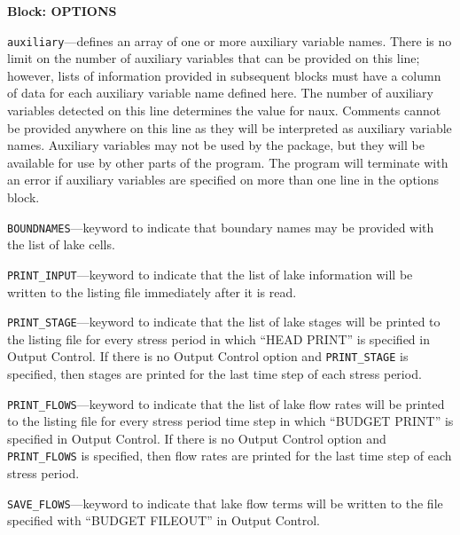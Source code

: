 
\item \textbf{Block: OPTIONS}

\begin{description}
\item \texttt{auxiliary}---defines an array of one or more auxiliary variable names.  There is no limit on the number of auxiliary variables that can be provided on this line; however, lists of information provided in subsequent blocks must have a column of data for each auxiliary variable name defined here.   The number of auxiliary variables detected on this line determines the value for naux.  Comments cannot be provided anywhere on this line as they will be interpreted as auxiliary variable names.  Auxiliary variables may not be used by the package, but they will be available for use by other parts of the program.  The program will terminate with an error if auxiliary variables are specified on more than one line in the options block.

\item \texttt{BOUNDNAMES}---keyword to indicate that boundary names may be provided with the list of lake cells.

\item \texttt{PRINT\_INPUT}---keyword to indicate that the list of lake information will be written to the listing file immediately after it is read.

\item \texttt{PRINT\_STAGE}---keyword to indicate that the list of lake stages will be printed to the listing file for every stress period in which ``HEAD PRINT'' is specified in Output Control.  If there is no Output Control option and \texttt{PRINT\_STAGE} is specified, then stages are printed for the last time step of each stress period.

\item \texttt{PRINT\_FLOWS}---keyword to indicate that the list of lake flow rates will be printed to the listing file for every stress period time step in which ``BUDGET PRINT'' is specified in Output Control.  If there is no Output Control option and \texttt{PRINT\_FLOWS} is specified, then flow rates are printed for the last time step of each stress period.

\item \texttt{SAVE\_FLOWS}---keyword to indicate that lake flow terms will be written to the file specified with ``BUDGET FILEOUT'' in Output Control.


\end{description}
